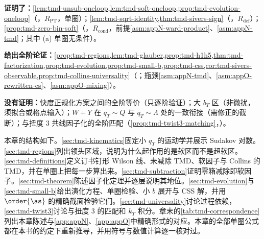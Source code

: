\begin{tcolorbox}[enhanced,breakable,title=本章证明了什么／没有证明什么,fonttitle=\bfseries,
  colback=gray!3!white,colframe=gray!55!black,boxrule=0.6pt,arc=2pt,
  left=5pt,right=5pt,top=3pt,bottom=3pt,before skip=6pt,after skip=6pt]
\textbf{证明了：}\cref{lem:tmd-unsub-oneloop,lem:tmd-soft-oneloop,prop:tmd-evolution-oneloop}（\tagR，$R_{\mathrm{PT}}$，单圈）；\cref{lem:tmd-sqrt-identity,thm:tmd-sivers-sign}（\tagR，$R_{\mathrm{def}}$）；\cref{prop:tmd-zero-bin-soft}（\tagR，$R_{\mathrm{cond}}$，前提\cref{asm:appN-ward-product}、\cref{asm:appN-tmd}；其中 (a) 单圈无条件）。\par
\textbf{给出全阶论证：}\cref{prop:tmd-regions,lem:tmd-glauber,prop:tmd-h1h5,thm:tmd-factorization,prop:tmd-evolution,prop:tmd-small-b,prop:tmd-css,cor:tmd-sivers-observable,prop:tmd-collins-universality}（\tagA；瓶颈\cref{asm:appN-tmd}、\cref{asm:appO-rewritten-cs}、\cref{asm:appO-mixing}）。\par
\textbf{没有证明：}快度正规化方案之间的全阶等价（只逐阶验证）；大 $b_T$ 区（非微扰，须拟合或格点输入）；$W+Y$ 在 $q_T\sim Q$ 与 $q_T\sim\Lambda$ 处的一致衔接（需修正的截断）；与扭度 3 共线因子化的全阶匹配（\cref{prop:tmd-twist3-matching}，\tagP）。
\end{tcolorbox}

本章的结构如下。\cref{sec:tmd-kinematics}固定小 $q_T$ 的运动学并展示 Sudakov 对数。\cref{sec:tmd-regions}列出领头区域，说明为什么起作用的是软区而不是超软区。\cref{sec:tmd-definitions}定义订书钉形 Wilson 线、未减除 TMD、软因子与 Collins 的 TMD，并在单圈上把每一步算出来。\cref{sec:tmd-subtraction}证明零箱减除即软因子。\cref{sec:tmd-theorem}陈述因子化定理并逐层说明其地位。\cref{sec:tmd-evolution}与\cref{sec:tmd-small-b}给出演化方程、单圈检验、小 $b$ 展开与 CSS 解，并用 $\order{\as}$ 的精确截面检验它们。\cref{sec:tmd-universality}讨论过程依赖，\cref{sec:tmd-twist3}讨论与扭度 3 的匹配和 $k_T$ 积分。章末的\cref{tab:tmd-correspondence}列出本章陈述与\cref{app:appN}、\cref{app:appO}中精确形式的对应。本章的全部单圈公式都在本书的约定下重新推导，并用符号与数值计算逐一核对过。
